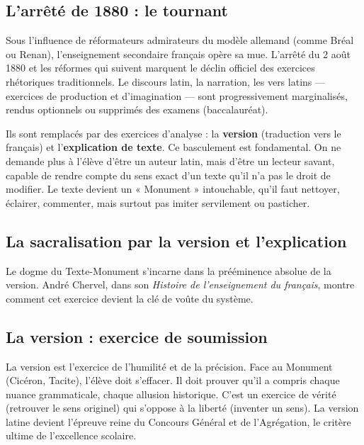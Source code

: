 \subsection{L'arrêté de 1880 : le tournant}

Sous l'influence de réformateurs admirateurs du modèle allemand (comme Bréal ou Renan),
l'enseignement secondaire français opère sa mue. L'arrêté du 2 août 1880 et les réformes qui suivent
marquent le déclin officiel des exercices rhétoriques traditionnels.\cite{I-1-3-ref23} Le discours
latin, la narration, les vers latins — exercices de production et d'imagination — sont
progressivement marginalisés, rendus optionnels ou supprimés des examens (baccalauréat).

Ils sont remplacés par des exercices d'analyse : la \textbf{version} (traduction vers le français)
et l'\textbf{explication de texte}. Ce basculement est fondamental. On ne demande plus à l'élève
d'être un auteur latin, mais d'être un lecteur savant, capable de rendre compte du sens exact d'un
texte qu'il n'a pas le droit de modifier. Le texte devient un « Monument » intouchable, qu'il faut
nettoyer, éclairer, commenter, mais surtout pas imiter servilement ou pasticher.



\subsection{La sacralisation par la version et l'explication}

Le dogme du Texte-Monument s'incarne dans la prééminence absolue de la version. André Chervel, dans
son \textit{Histoire de l'enseignement du français}, montre comment cet exercice devient la clé de
voûte du système.\cite{I-1-3-ref26}



\subsection{La version : exercice de soumission}

La version est l'exercice de l'humilité et de la précision. Face au Monument (Cicéron, Tacite),
l'élève doit s'effacer. Il doit prouver qu'il a compris chaque nuance grammaticale, chaque allusion
historique. C'est un exercice de vérité (retrouver le sens originel) qui s'oppose à la liberté
(inventer un sens). La version latine devient l'épreuve reine du Concours Général et de
l'Agrégation, le critère ultime de l'excellence scolaire.\cite{I-1-3-ref28}



